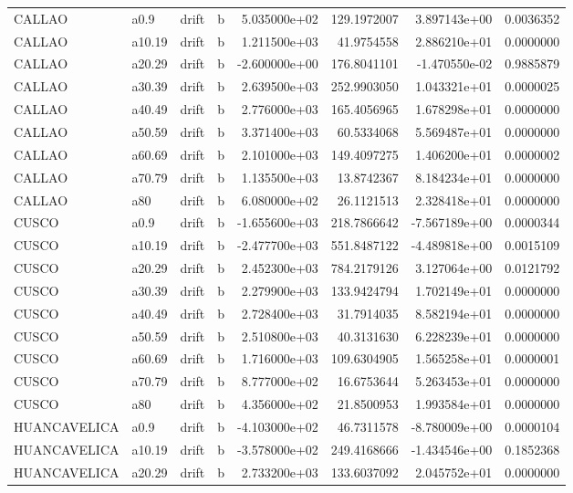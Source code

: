 \documentclass[
]{article}
\begin{document}
\begin{table}[!h]
\begin{tabular}[t]{llllrrrr}
CALLAO & a0.9 & drift & b & 5.035000e+02 & 129.1972007 & 3.897143e+00 & 0.0036352\\
CALLAO & a10.19 & drift & b & 1.211500e+03 & 41.9754558 & 2.886210e+01 & 0.0000000\\
\addlinespace
CALLAO & a20.29 & drift & b & -2.600000e+00 & 176.8041101 & -1.470550e-02 & 0.9885879\\
CALLAO & a30.39 & drift & b & 2.639500e+03 & 252.9903050 & 1.043321e+01 & 0.0000025\\
CALLAO & a40.49 & drift & b & 2.776000e+03 & 165.4056965 & 1.678298e+01 & 0.0000000\\
CALLAO & a50.59 & drift & b & 3.371400e+03 & 60.5334068 & 5.569487e+01 & 0.0000000\\
CALLAO & a60.69 & drift & b & 2.101000e+03 & 149.4097275 & 1.406200e+01 & 0.0000002\\
\addlinespace
CALLAO & a70.79 & drift & b & 1.135500e+03 & 13.8742367 & 8.184234e+01 & 0.0000000\\
CALLAO & a80 & drift & b & 6.080000e+02 & 26.1121513 & 2.328418e+01 & 0.0000000\\
CUSCO & a0.9 & drift & b & -1.655600e+03 & 218.7866642 & -7.567189e+00 & 0.0000344\\
CUSCO & a10.19 & drift & b & -2.477700e+03 & 551.8487122 & -4.489818e+00 & 0.0015109\\
CUSCO & a20.29 & drift & b & 2.452300e+03 & 784.2179126 & 3.127064e+00 & 0.0121792\\
\addlinespace
CUSCO & a30.39 & drift & b & 2.279900e+03 & 133.9424794 & 1.702149e+01 & 0.0000000\\
CUSCO & a40.49 & drift & b & 2.728400e+03 & 31.7914035 & 8.582194e+01 & 0.0000000\\
CUSCO & a50.59 & drift & b & 2.510800e+03 & 40.3131630 & 6.228239e+01 & 0.0000000\\
CUSCO & a60.69 & drift & b & 1.716000e+03 & 109.6304905 & 1.565258e+01 & 0.0000001\\
CUSCO & a70.79 & drift & b & 8.777000e+02 & 16.6753644 & 5.263453e+01 & 0.0000000\\
\addlinespace
CUSCO & a80 & drift & b & 4.356000e+02 & 21.8500953 & 1.993584e+01 & 0.0000000\\
HUANCAVELICA & a0.9 & drift & b & -4.103000e+02 & 46.7311578 & -8.780009e+00 & 0.0000104\\
HUANCAVELICA & a10.19 & drift & b & -3.578000e+02 & 249.4168666 & -1.434546e+00 & 0.1852368\\
HUANCAVELICA & a20.29 & drift & b & 2.733200e+03 & 133.6037092 & 2.045752e+01 & 0.0000000\\

\end{tabular}
\end{table}
\end{document}
